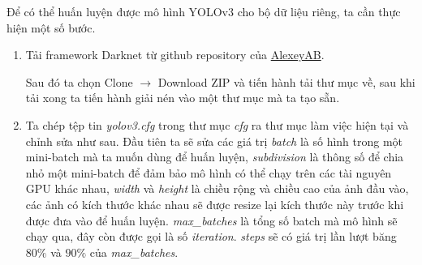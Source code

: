 Để có thể huấn luyện được mô hình YOLOv3 cho bộ dữ liệu riêng, ta cần thực hiện một số bước.
\begin{enumerate}
	\item Tải framework Darknet từ github repository của \href{https://github.com/AlexeyAB/darknet}{AlexeyAB}.
	
\noindent{}

	Sau đó ta chọn Clone $\rightarrow$ Download ZIP và tiến hành tải thư mục về, sau khi tải xong ta tiến hành giải nén vào một thư mục mà ta tạo sẵn.
	\item Ta chép tệp tin \emph{yolov3.cfg} trong thư mục \emph{cfg} ra thư mục làm việc hiện tại và chỉnh sửa như sau. Đầu tiên ta sẽ sửa các giá trị \emph{batch} là số hình trong một mini-batch mà ta muốn dùng để huấn luyện, \emph{subdivision} là thông số để chia nhỏ một mini-batch để đảm bảo mô hình có thể chạy trên các tài nguyên GPU khác nhau, \emph{width} và \emph{height} là chiều rộng và chiều cao của ảnh đầu vào, các ảnh có kích thước khác nhau sẽ được resize lại kích thước này trước khi được đưa vào để huấn luyện. \emph{max{\_}batches} là tổng số batch mà mô hình sẽ chạy qua, đây còn được gọi là số \emph{iteration}. \emph{steps} sẽ có giá trị lần lượt băng $80\%$ và $90\%$ của \emph{max{\_}batches}.

\noindent{}


\end{enumerate}
